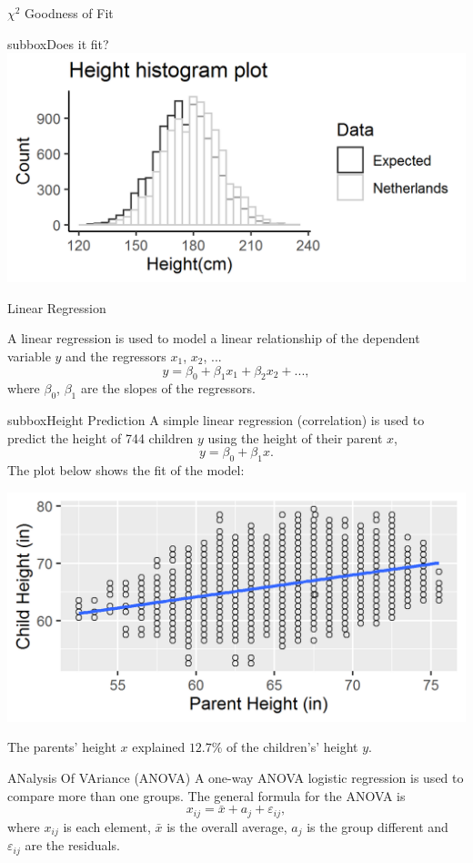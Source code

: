 \documentclass[10pt,a4paper]{article}
\begin{document}
\begin{multicols}{3}
\begin{textbox}{$\chi^2$ Goodness of Fit}
\begin{subbox}{subbox}{Does it fit?}
\includegraphics[width=\textwidth]{Figures/Distributions/GoF.png}
\end{subbox}
\end{textbox}

\begin{textbox}{Linear Regression}

A linear regression is used to model a linear relationship of the dependent variable $y$ and the regressors $x_1$, $x_2$, ...
	\[  y=\beta_0+\beta_1 x_{1} +\beta_2 x_{2}+..., \]
	where $\beta_0$, $\beta_1$ are the slopes of the regressors.

\begin{subbox}{subbox}{Height Prediction}
\tiny
A simple linear regression (correlation) is used to predict the height of 744 children $y$ using the height of their parent $x$, 
\[  y=\beta_0+\beta_1 x.\]
The plot below shows the fit of the model:
\begin{center}
\includegraphics[width=\textwidth]{Figures/Regression/Linear_Regression.png}
\end{center}
The parents' height $x$ explained $12.7\%$ of the children's' height $y$.
\end{subbox}
\end{textbox}
\begin{textbox}{ANalysis Of VAriance (ANOVA)}
A one-way ANOVA logistic regression is used to compare more than one groups.
The general formula for the ANOVA is 
	\[  x_{ij}=\bar{x}+a_j+\varepsilon_{ij}, \]
where $x_{ij}$ is each element, $\bar{x}$ is the overall average, $a_j$ is the group different and $\varepsilon_{ij}$ are the residuals.


\end{textbox}
\end{multicols}
\end{document}

